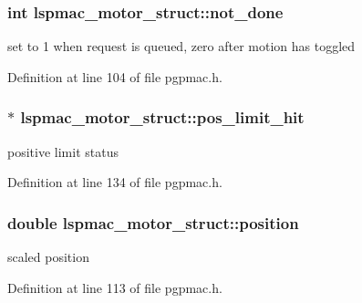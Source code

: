 \hypertarget{structlspmac__motor__struct_ab7bd8bff48953ce05c758598d75877ac}{
\subsubsection[{not\-\_\-done}]{\setlength{\rightskip}{0pt plus 5cm}int lspmac\-\_\-motor\-\_\-struct\-::not\-\_\-done}}\label{structlspmac__motor__struct_ab7bd8bff48953ce05c758598d75877ac}


set to 1 when request is queued, zero after motion has toggled 



Definition at line 104 of file pgpmac.\-h.

\hypertarget{structlspmac__motor__struct_af39d2e7a681d7c2fbdc39d53fab1a475}{
\subsubsection[{pos\-\_\-limit\-\_\-hit}]{$\ast$ lspmac\-\_\-motor\-\_\-struct\-::pos\-\_\-limit\-\_\-hit}}\label{structlspmac__motor__struct_af39d2e7a681d7c2fbdc39d53fab1a475}


positive limit status 



Definition at line 134 of file pgpmac.\-h.

\hypertarget{structlspmac__motor__struct_af8ffb3aed907d8664b65b37601954411}{
\subsubsection[{position}]{\setlength{\rightskip}{0pt plus 5cm}double lspmac\-\_\-motor\-\_\-struct\-::position}}\label{structlspmac__motor__struct_af8ffb3aed907d8664b65b37601954411}


scaled position 



Definition at line 113 of file pgpmac.\-h.

